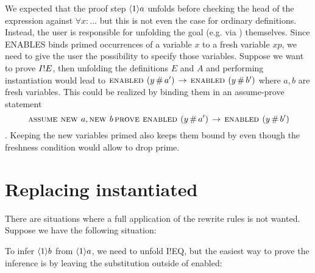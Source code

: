 \documentclass[a4paper]{article}
\theoremstyle{definition}
\begin{document}
\begin{itemize}
We expected that the proof step $\langle{1}\rangle{a}$ unfolds 
 before checking the head of the expression against $\forall x : \ldots$ but
 this is not even the case for ordinary definitions. Instead, the user is
 responsible for unfolding the goal (e.g. via \tla{$\SUFFICES$}) themselves.
 Since ENABLES binds primed occurrences of a variable $x$ to a fresh variable
 $xp$, we need to give the user the possibility to specify those variables.
 Suppose we want to prove $I!E$, then unfolding the definitions $E$ and
 $A$ and performing instantiation would lead to
 $\textsc{enabled } (y \,\#\, a') \,\rightarrow\, \textsc{enabled }(y \,\#\, b')$ where $a,b$ are fresh
 variables. This could be realized by binding them in an assume-prove statement
 $$\mbox{\sc assume } \mbox{\sc new } a, \mbox{\sc new } b \mbox{\,\sc prove } \textsc{enabled } (y \,\#\, a') \,\rightarrow\,
   \textsc{enabled }(y \,\#\, b')$$. Keeping the new variables primed also keeps them
 bound by \ENABLED even though the freshness condition would allow to drop
 prime.


\end{itemize}

\section{Replacing instantiated \ENABLED}
There are situations where a full application of the rewrite rules is not
 wanted. Suppose we have the following situation:

\begin{parcolumns}{2}
\end{parcolumns}

To infer $\langle{1}\rangle{b}$ from $\langle{1}\rangle{a}$, we need to unfold I!EQ,
 but the easiest way to prove the inference is by leaving the substitution
 outside of enabled:
\end{document}
